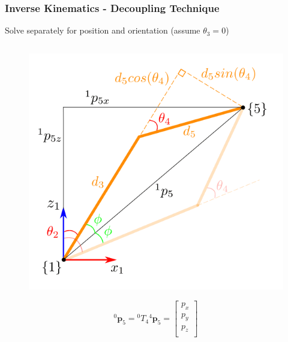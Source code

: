 \begin{frame}
\frametitle{Inverse Kinematics - Decoupling Technique}
Solve separately for position and orientation (assume $θ_3 = 0$)
\begin{columns}
\begin{center}
\begin{figure}[htbp]
\centering
\includegraphics[width=\textwidth]{../images/th2-4-calculation.png}\\
\end{figure}
\[
{}^0\mathbf{p}_5 = {}^0T_4 {}^4\mathbf{p}_5 = \begin{bmatrix} p_x \\ p_y \\ p_z \\ \end{bmatrix}
\]
\end{center}



\end{columns}
\end{frame}
